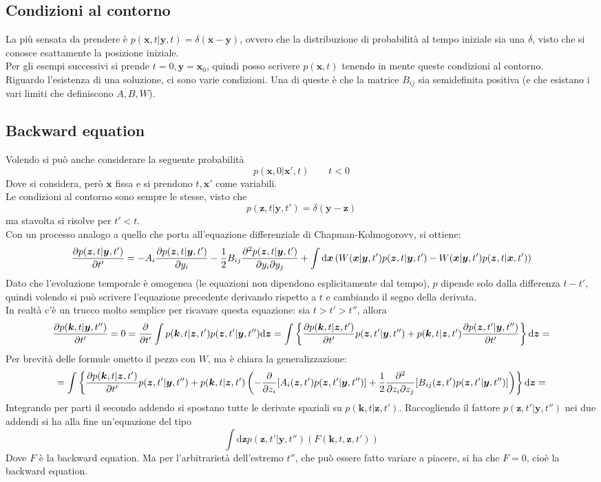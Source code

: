 \documentclass[a4paper,12pt]{article}
\theoremstyle{plain}
\renewcommand{\vec}[1]{{\boldsymbol{#1}}}
\theoremstyle{definition}
\newcommand{\f}[2]{\frac{#1}{#2}}
\newcommand{\kvec}{\vec{k}}
\renewcommand{\d}{\text{d}}
\newcommand{\pos}{\vec{x}}
\theoremstyle{remark}
\begin{document}
\subsection{Condizioni al contorno}
La più sensata da prendere è $p(\pos,t|\vec{y},t)=\delta(\pos-\vec{y})$, ovvero che la distribuzione di probabilità al tempo iniziale sia una $\delta$, visto che si conosce esattamente la posizione iniziale.\\Per gli esempi successivi si prende $t=0,\vec{y}=\pos_0$, quindi posso scrivere $p(\pos,t)$ tenendo in mente queste condizioni al contorno.
\\Riguardo l'esistenza di una soluzione, ci sono varie condizioni. Una di queste è che la matrice $B_{ij}$ sia semidefinita positiva (e che esistano i vari limiti che definiscono $A,B,W$).\subsection{Backward equation}
Volendo si può anche considerare la seguente probabilità
\[p(\pos,0|\pos',t)\quad\quad t<0\]
Dove si considera, però $\pos$ fissa e si prendono $t,\pos'$ come variabili.\\Le condizioni al contorno sono sempre le stesse, visto che
\[p(\vec{z},t|\vec{y},t')=\delta(\vec{y}-\vec{z})\]
ma stavolta si risolve per $t'<t$.\\Con un processo analogo a quello che porta all'equazione differenziale di Chapman-Kolmogorovv, si ottiene:
\begin{equation}
{\pdv{p(\vec{z},t|\vec{y},t')}{t'}	=-A_{i}\pdv{p(\vec{z},t|\vec{y},t')}{{y}_i}-\f{1}{2}B_{ij}\pdv{p(\vec{z},t|\vec{y},t')}{y_i}{y_j}			
+\int \d \vec{x}\left( W(\vec{x}|\vec{y},t')p(\vec{z},t|\vec{y},t')-W(\vec{x}|\vec{y},t')p(\vec{z},t|\vec{x},t')\right)}\label{rev}
\end{equation}
Dato che l'evoluzione temporale è omogenea (le equazioni non dipendono esplicitamente dal tempo), $p$ dipende solo dalla differenza $t-t'$, quindi volendo si può scrivere l'equazione precedente derivando rispetto a $t$ e cambiando il segno della derivata.
\\In realtà c'è un trucco molto semplice per ricavare questa equazione:
sia $t>t'>t''$, allora
\[\pdv{p(\kvec,t|\vec{y},t'')}{t'}=0=\pdv{t'}\int 	 p(\kvec,t|\vec{z},t')p(\vec{z},t'|\vec{y},t'')\d \vec{z}=\int 	\left\{ \pdv{p(\kvec,t|\vec{z},t')}{t'}p(\vec{z},t'|\vec{y},t'')+{p(\kvec,t|\vec{z},t')}\pdv{p(\vec{z},t'|\vec{y},t'')}{t'}\right\}\d \vec{z}=	\]
Per brevità delle formule ometto il pezzo con $W$, ma è chiara la generalizzazione:
\[=\int 	\left\{ \pdv{p(\kvec,t|\vec{z},t')}{t'}p(\vec{z},t'|\vec{y},t'')+{p(\kvec,t|\vec{z},t')}\left(-\pdv{z_i}[A_i(\vec{z},t') p(\vec{z},t'|\vec{y},t'')]+\frac{1}{2}\pdv{}{z_i}{z_j}[B_{ij}(\vec{z},t')p(\vec{z},t'|\vec{y},t'')]\right)\right\}\d \vec{z}=	\]
Integrando per parti il secondo addendo si spostano tutte le derivate spaziali su $p(\kvec,t|\vec{z},t')$. Raccogliendo il fattore $p(\vec{z},t'|\vec{y},t'')$ nei due addendi si ha alla fine un'equazione del tipo
\[\int \d	\vec{z}p(\vec{z},t'|\vec{y},t'')\left(F(\kvec,t,\vec{z},t')\right)\]
Dove $F$ è la backward equation. Ma per l'arbitrarietà dell'estremo $t''$, che può essere fatto variare a piacere, si ha che $F=0$, cioè la backward equation.
\end{document}
